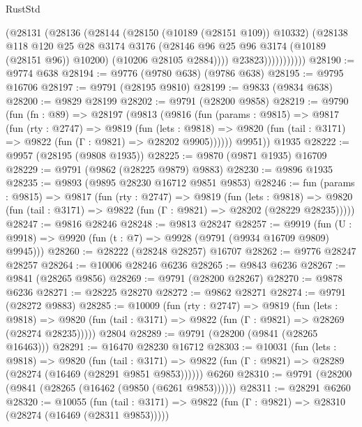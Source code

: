 \begin{lexlean}{RustStd}
\begin{coremodule}
                        (@28131
                          (@28136
                            (@28144
                              (@28150 (@10189 (@28151 @109)) @10332)
                              (@28138
                                @118
                                @120
                                @25
                                @28
                                @3174
                                @3176
                                (@28146 @96 @25 @96 @3174 (@10189 (@28151 @96)) @10200)
                                (@10206 @28105 @2884))))
                          @23823)))))))))))
@28190 := @9774 @638
@28194 := @9776 (@9780 @638) (@9786 @638)
@28195 := @9795 @16706
@28197 := @9791 (@28195 @9810)
@28199 := @9833 (@9834 @638)
@28200 := @9829 @28199
@28202 := @9791 (@28200 @9858)
@28219 := @9790
    (fun (fn : @89) =>
    @28197
      (@9813
        (@9816
          (fun (params : @9815) =>
          @9817
            (fun (rty : @2747) =>
            @9819
              (fun (lets : @9818) =>
              @9820 (fun (tail : @3171) => @9822 (fun (Γ : @9821) => @28202 @9905))))))
        @9951))
    @1935
@28222 := @9957 (@28195 (@9808 @1935))
@28225 := @9870 (@9871 @1935) @16709
@28229 := @9791 (@9862 (@28225 @9879) @9883)
@28230 := @9896 @1935
@28235 := @9893 (@9895 @28230 @16712 @9851 @9853)
@28246 := fun (params : @9815) =>
  @9817
    (fun (rty : @2747) =>
    @9819
      (fun (lets : @9818) =>
      @9820 (fun (tail : @3171) => @9822 (fun (Γ : @9821) => @28202 (@28229 @28235)))))
@28247 := @9816 @28246
@28248 := @9813 @28247
@28257 := @9919
    (fun (U : @9918) => @9920 (fun (t : @7) => @9928 (@9791 (@9934 @16709 @9809) @9945)))
@28260 := @28222 (@28248 @28257) @16707
@28262 := @9776 @28247 @28257
@28264 := @10006 @28246 @6236
@28265 := @9843 @6236
@28267 := @9841 (@28265 @9856)
@28269 := @9791 (@28200 @28267)
@28270 := @9878 @6236
@28271 := @28225 @28270
@28272 := @9862 @28271
@28274 := @9791 (@28272 @9883)
@28285 := @10009
    (fun (rty : @2747) =>
    @9819
      (fun (lets : @9818) =>
      @9820 (fun (tail : @3171) => @9822 (fun (Γ : @9821) => @28269 (@28274 @28235)))))
    @2804
@28289 := @9791 (@28200 (@9841 (@28265 @16463)))
@28291 := @16470 @28230 @16712
@28303 := @10031
    (fun (lets : @9818) =>
    @9820
      (fun (tail : @3171) =>
      @9822 (fun (Γ : @9821) => @28289 (@28274 (@16469 (@28291 @9851 @9853))))))
    @6260
@28310 := @9791 (@28200 (@9841 (@28265 (@16462 (@9850 (@6261 @9853))))))
@28311 := @28291 @6260
@28320 := @10055
    (fun (tail : @3171) => @9822 (fun (Γ : @9821) => @28310 (@28274 (@16469 (@28311 @9853)))))

\end{coremodule}
\end{lexlean}
